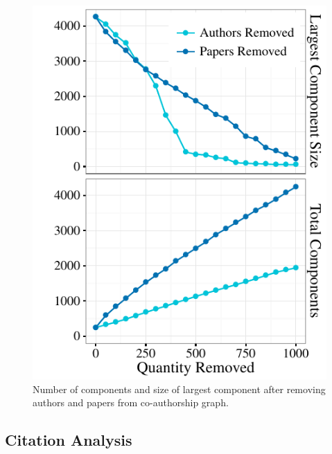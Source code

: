 \documentclass[12pt,5p]{elsarticle}
\begin{document}
\begin{figure}
  \begin{center}
    \includegraphics[]{figures/connected_after_removing}%
    \caption{Number of components and size of largest component after removing authors and papers from co-authorship graph.
        \label{fig:connected_after_removing}
    }
  \end{center}
\end{figure}

\subsection{Citation Analysis} 
\end{document}
